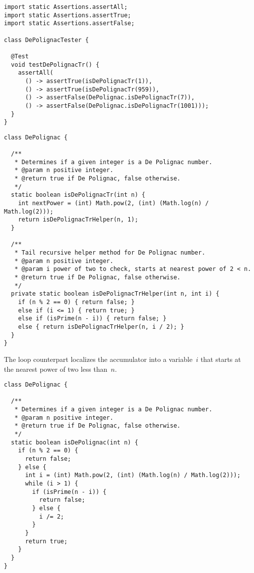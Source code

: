 \enlargethispage{1\baselineskip}
\begin{lstlisting}[language=MyJava]
import static Assertions.assertAll;
import static Assertions.assertTrue;
import static Assertions.assertFalse;

class DePolignacTester {

  @Test
  void testDePolignacTr() {
    assertAll(
      () -> assertTrue(isDePolignacTr(1)),
      () -> assertTrue(isDePolignacTr(959)),
      () -> assertFalse(DePolignac.isDePolignacTr(7)),
      () -> assertFalse(DePolignac.isDePolignacTr(1001)));
  }
}
\end{lstlisting}

\begin{lstlisting}[language=MyJava]
class DePolignac {
  
  /**
   * Determines if a given integer is a De Polignac number.
   * @param n positive integer.
   * @return true if De Polignac, false otherwise.
   */
  static boolean isDePolignacTr(int n) {
    int nextPower = (int) Math.pow(2, (int) (Math.log(n) / Math.log(2)));
    return isDePolignacTrHelper(n, 1);
  }
  
  /**
   * Tail recursive helper method for De Polignac number.
   * @param n positive integer.
   * @param i power of two to check, starts at nearest power of 2 < n.
   * @return true if De Polignac, false otherwise.
   */
  private static boolean isDePolignacTrHelper(int n, int i) {
    if (n % 2 == 0) { return false; }
    else if (i <= 1) { return true; }
    else if (isPrime(n - i)) { return false; }
    else { return isDePolignacTrHelper(n, i / 2); }
  }
}
\end{lstlisting}

The loop counterpart localizes the accumulator into a variable~$i$ that starts at the nearest power of two less than~$n$.

\begin{lstlisting}[language=MyJava]
class DePolignac {

  /**
   * Determines if a given integer is a De Polignac number.
   * @param n positive integer.
   * @return true if De Polignac, false otherwise.
   */
  static boolean isDePolignac(int n) {
    if (n % 2 == 0) { 
      return false; 
    } else {
      int i = (int) Math.pow(2, (int) (Math.log(n) / Math.log(2)));
      while (i > 1) {
        if (isPrime(n - i)) { 
          return false; 
        } else { 
          i /= 2; 
        }
      }
      return true;
    }
  }
}
\end{lstlisting}

